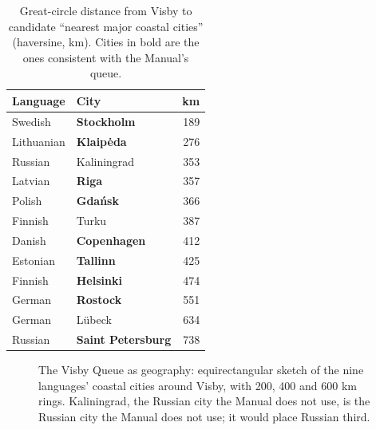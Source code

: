 \begin{table}[t]
\centering\small
\caption{Great-circle distance from Visby to candidate ``nearest major coastal cities'' (haversine, km). Cities in bold are the ones consistent with the Manual's queue.}
\label{tab:visby}
\begin{tabular}{@{}llr@{}}
\toprule
Language & City & km \\
\midrule
Swedish & \textbf{Stockholm} & 189 \\
Lithuanian & \textbf{Klaipėda} & 276 \\
Russian & Kaliningrad & 353 \\
Latvian & \textbf{Riga} & 357 \\
Polish & \textbf{Gdańsk} & 366 \\
Finnish & Turku & 387 \\
Danish & \textbf{Copenhagen} & 412 \\
Estonian & \textbf{Tallinn} & 425 \\
Finnish & \textbf{Helsinki} & 474 \\
German & \textbf{Rostock} & 551 \\
German & Lübeck & 634 \\
Russian & \textbf{Saint Petersburg} & 738 \\
\bottomrule
\end{tabular}
\end{table}

\begin{figure}[t]
\centering
{}
\caption{The Visby Queue as geography: equirectangular sketch of the nine languages' coastal cities around Visby, with 200, 400 and 600 km rings. Kaliningrad, the Russian city the Manual does not use, is the Russian city the Manual does not use; it would place Russian third.}
\label{fig:visby}
\end{figure}
